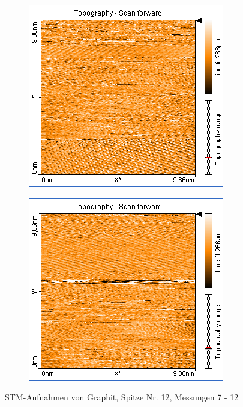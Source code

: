 \begin{figure}
\begin{subfigure}[b]{\picwidth}
        \caption{}
        \label{fig:graphit_06_10}
    \end{subfigure}
    \begin{subfigure}[b]{\picwidth}
        \includegraphics[width=\textwidth]{data/Graphit/pic_06_11_10nm}
        \caption{}
        \label{fig:graphit_06_11}
    \end{subfigure}\qquad
    \begin{subfigure}[b]{\picwidth}
        \includegraphics[width=\textwidth]{data/Graphit/pic_06_12_10nm}
        \caption{}
        \label{fig:graphit_06_12}
    \end{subfigure}
    \caption{STM-Aufnahmen von Graphit, Spitze Nr. 12, Messungen 7 - 12}\label{fig:graphit_06}
\end{figure}
